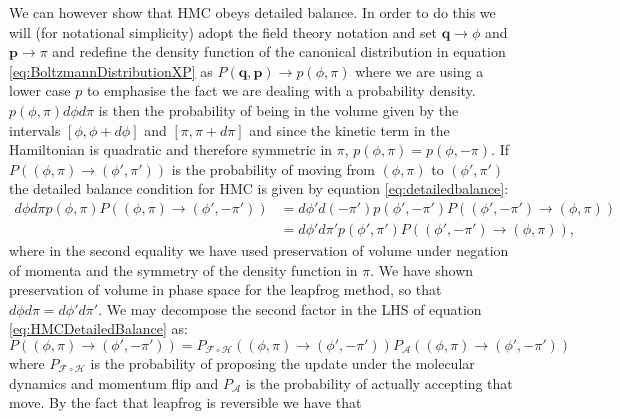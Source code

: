 \documentclass[12pt]{article}
\begin{document}
            We can however show that HMC obeys detailed balance. In order to do this we will (for notational simplicity) adopt the field theory notation and set $\bm{q}\rightarrow \phi$ and $\bm{p}\rightarrow \pi$ and redefine the density function of the canonical distribution in equation \ref{eq:BoltzmannDistributionXP} as $P\left(\bm{q},\bm{p}\right) \rightarrow p\left(\phi,\pi\right)$ where we are using a lower case $p$ to emphasise the fact we are dealing with a probability density. $p\left(\phi,\pi\right)d\phi d\pi$ is then the probability of being in the volume given by the intervals $\left[\phi,\phi+d\phi\right]$ and  $\left[\pi,\pi+d\pi\right]$ and since the kinetic term in the Hamiltonian is quadratic and therefore symmetric in $\pi$, $p\left(\phi,\pi\right)=p\left(\phi,-\pi\right)$. If $P\left(\left(\phi,\pi\right)\rightarrow\left(\phi',\pi'\right)\right)$ is the probability of moving from $\left(\phi,\pi\right)$ to $\left(\phi',\pi'\right)$ the detailed balance condition for HMC is given by equation \ref{eq:detailedbalance}:
            \begin{align}
                \label{eq:HMCDetailedBalance}
                d\phi d\pi p\left(\phi,\pi\right) P\left(\left(\phi,\pi\right)\rightarrow\left(\phi',-\pi'\right)\right) & = d\phi' d\left(-\pi'\right) p\left(\phi',-\pi'\right) P\left(\left(\phi',-\pi'\right)\rightarrow\left(\phi,\pi\right)\right) \\
                & = d\phi' d\pi' p\left(\phi',\pi'\right) P\left(\left(\phi',-\pi'\right)\rightarrow\left(\phi,\pi\right)\right),
            \end{align}
            where in the second equality we have used preservation of volume under negation of momenta and the symmetry of the density function in $\pi$. We have shown preservation of volume in phase space for the leapfrog method, so that $d\phi d\pi = d\phi' d\pi'$. We may decompose the second factor in the LHS of equation \ref{eq:HMCDetailedBalance} as:
            \begin{equation}
                P\left(\left(\phi,\pi\right) \rightarrow \left(\phi',-\pi'\right)\right) = P_{\mathcal{F}\circ \mathcal{H}}\left(\left(\phi,\pi\right) \rightarrow \left(\phi',-\pi'\right)\right)P_{\mathcal{A}}\left(\left(\phi,\pi\right)\rightarrow \left(\phi',-\pi'\right)\right)
            \end{equation}
            where $P_{\mathcal{F}\circ \mathcal{H}}$ is the probability of proposing the update under the molecular dynamics and momentum flip and $P_\mathcal{A}$ is the probability of actually accepting that move. By the fact that leapfrog is reversible we have that
\end{document}
